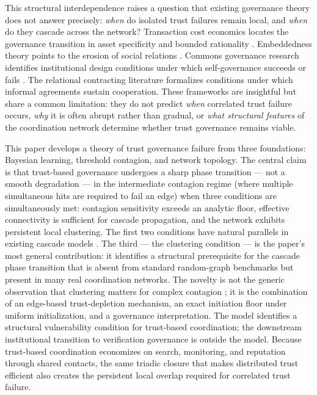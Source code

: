 \documentclass[11pt,a4paper]{article}
\begin{document}
This structural interdependence raises a question that existing governance theory does not answer precisely: \emph{when} do isolated trust failures remain local, and \emph{when} do they cascade across the network? Transaction cost economics locates the governance transition in asset specificity and bounded rationality \cite{williamson1975,williamson1985}. Embeddedness theory points to the erosion of social relations \cite{granovetter1985}. Commons governance research identifies institutional design conditions under which self-governance succeeds or fails \cite{ostrom1990}. The relational contracting literature \cite{baker2002} formalizes conditions under which informal agreements sustain cooperation. These frameworks are insightful but share a common limitation: they do not predict \emph{when} correlated trust failure occurs, \emph{why} it is often abrupt rather than gradual, or \emph{what structural features} of the coordination network determine whether trust governance remains viable.

This paper develops a theory of trust governance failure from three foundations: Bayesian learning, threshold contagion, and network topology. The central claim is that trust-based governance undergoes a sharp phase transition --- not a smooth degradation --- in the intermediate contagion regime (where multiple simultaneous hits are required to fail an edge) when three conditions are simultaneously met: contagion sensitivity exceeds an analytic floor, effective connectivity is sufficient for cascade propagation, and the network exhibits persistent local clustering. The first two conditions have natural parallels in existing cascade models \cite{granovetter1978,watts2002}. The third --- the clustering condition --- is the paper's most general contribution: it identifies a structural prerequisite for the cascade phase transition that is absent from standard random-graph benchmarks but present in many real coordination networks. The novelty is not the generic observation that clustering matters for complex contagion \cite{centola2007}; it is the combination of an edge-based trust-depletion mechanism, an exact initiation floor under uniform initialization, and a governance interpretation. The model identifies a structural vulnerability condition for trust-based coordination; the downstream institutional transition to verification governance is outside the model. Because trust-based coordination economizes on search, monitoring, and reputation through shared contacts, the same triadic closure that makes distributed trust efficient also creates the persistent local overlap required for correlated trust failure.
\end{document}
